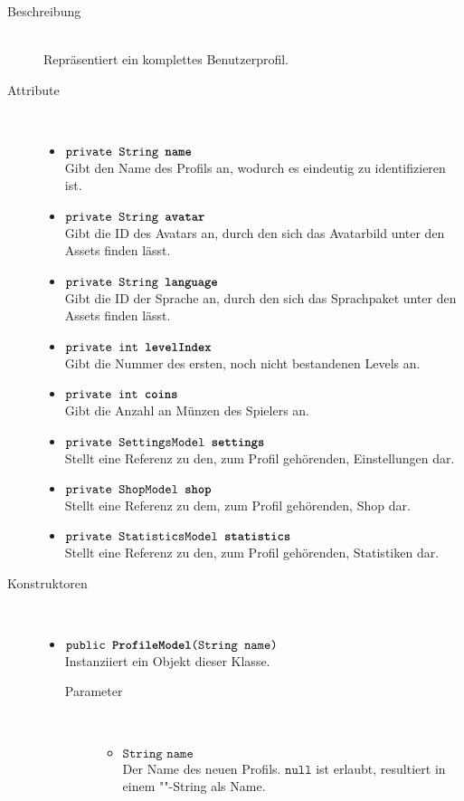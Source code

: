 \begin{description}
\item[Beschreibung] \hfill \\ Repräsentiert ein komplettes Benutzerprofil.

\item[Attribute] \hfill \\
	\vspace{-.8cm}
	\begin{itemize}
		\item $\texttt{private String \textbf{name}}$ \\ Gibt den Name des Profils an, wodurch es eindeutig zu identifizieren ist. 
		\item $\texttt{private String \textbf{avatar}}$ \\ Gibt die ID des Avatars an, durch den sich das Avatarbild unter den Assets finden lässt.
		\item $\texttt{private String \textbf{language}}$ \\ Gibt die ID der Sprache an, durch den sich das Sprachpaket unter den Assets finden lässt.
		\item $\texttt{private int \textbf{levelIndex}}$ \\ Gibt die Nummer des ersten, noch nicht bestandenen Levels an.
		\item $\texttt{private int \textbf{coins}}$ \\ Gibt die Anzahl an Münzen des Spielers an.
		\item $\texttt{private SettingsModel \textbf{settings}}$ \\ Stellt eine Referenz zu den, zum Profil gehörenden, Einstellungen dar.
		\item $\texttt{private ShopModel \textbf{shop}}$ \\ Stellt eine Referenz zu dem, zum Profil gehörenden, Shop dar.
		\item $\texttt{private StatisticsModel \textbf{statistics}}$ \\ Stellt eine Referenz zu den, zum Profil gehörenden, Statistiken dar.
	\end{itemize}
	
\item[Konstruktoren] \hfill \\
	\vspace{-.8cm}
	\begin{itemize}
		\item $\texttt{public \textbf{ProfileModel}(String name)}$ \\ Instanziiert ein Objekt dieser Klasse.
		\begin{description}
			\item[Parameter] \hfill \\
			\vspace{-.8cm}
			\begin{itemize}
				\item $\texttt{String name}$ \\ Der Name des neuen Profils. $\texttt{null}$ ist erlaubt, resultiert in einem ""-String als Name.
			\end{itemize}
		\end{description}
	\end{itemize}
	

\end{description}
